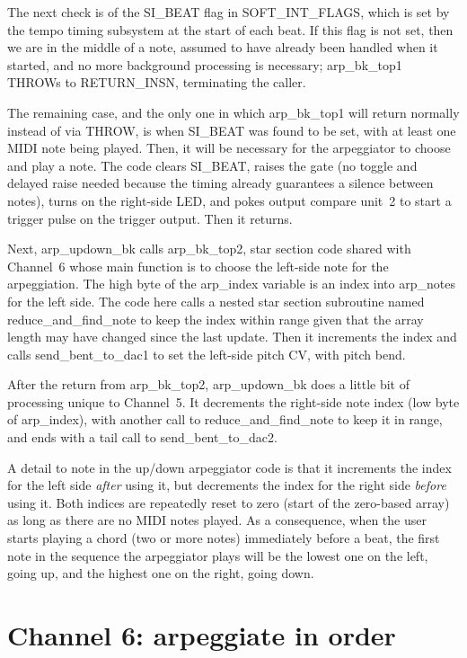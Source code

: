 The next check is of the SI\_BEAT flag in SOFT\_INT\_FLAGS, which is set by
the tempo timing subsystem at the start of each beat.  If this flag is not
set, then we are in the middle of a note, assumed to have already been
handled when it started, and no more background processing is necessary;
arp\_bk\_top1 THROWs to RETURN\_INSN, terminating the caller.

The remaining case, and the only one in which arp\_bk\_top1 will return
normally instead of via THROW, is when SI\_BEAT was found to be set, with at
least one MIDI note being played.  Then, it will be necessary for the
arpeggiator to choose and play a note.  The code clears SI\_BEAT, raises the
gate (no toggle and delayed raise needed because the timing already
guarantees a silence between notes), turns on the right-side LED, and pokes
output compare unit~2 to start a trigger pulse on the trigger output.  Then
it returns.

Next, arp\_updown\_bk calls arp\_bk\_top2, star section code shared with
Channel~6 whose main function is to choose the left-side note for the
arpeggiation.  The high byte of the arp\_index variable is an index into
arp\_notes for the left side.  The code here calls a nested star section
subroutine named reduce\_and\_find\_note to keep the index within range
given that the array length may have changed since the last update.  Then it
increments the index and calls send\_bent\_to\_dac1 to set the left-side
pitch CV, with pitch bend.

After the return from arp\_bk\_top2, arp\_updown\_bk does a little bit of
processing unique to Channel~5.  It decrements the right-side note index
(low byte of arp\_index), with another call to reduce\_and\_find\_note to
keep it in range, and ends with a tail call to send\_bent\_to\_dac2.

A detail to note in the up/down arpeggiator code is that it increments the
index for the left side \emph{after} using it, but decrements the index for
the right side \emph{before} using it.  Both indices are repeatedly reset to
zero (start of the zero-based array) as long as there are no MIDI notes
played.  As a consequence, when the user starts playing a chord (two or more
notes) immediately before a beat, the first note in the sequence the
arpeggiator plays will be the lowest one on the left, going up, and the
highest one on the right, going down.

\section{Channel 6:  arpeggiate in order}

